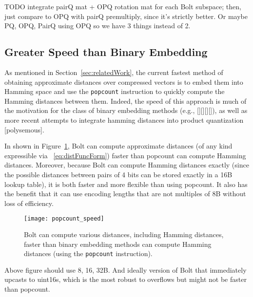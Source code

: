 TODO integrate pairQ mat + OPQ rotation mat for each Bolt subspace; then, just compare to OPQ with pairQ premultiply, since it's strictly better. Or maybe PQ, OPQ, PairQ using OPQ so we have 3 things instead of 2.


\subsection{Greater Speed than Binary Embedding}

As mentioned in Section~\ref{sec:relatedWork}, the current fastest method of obtaining approximate distances over compressed vectors is to embed them into Hamming space and use the \texttt{popcount} instruction to quickly compute the Hamming distances between them. Indeed, the speed of this approach is much of the motivation for the class of binary embedding methods (e.g., [][][][]), as well as more recent attempts to integrate hamming distances into product quantization [polysemous].

In shown in Figure~\ref{fig:bolt_vs_popcount}, Bolt can compute approximate distances (of any kind expressible via ~\ref{eq:distFuncForm}) faster than popcount can compute Hamming distances. Moreover, because Bolt can compute Hamming distances exactly (since the possible distances between pairs of 4 bits can be stored exactly in a 16B lookup table), it is both faster and more flexible than using popcount. It also has the benefit that it can use encoding lengths that are not multiples of 8B without loss of efficiency.

\begin{figure}[h]
\begin{center}
\label{fig:bolt_vs_popcount}
\texttt{[image: popcount\_speed]}
\vspace*{-1mm}
\caption{Bolt can compute various distances, including Hamming distances, faster than binary embedding methods can compute Hamming distances (using the \texttt{popcount} instruction).}
\end{center}
\end{figure}

Above figure should use 8, 16, 32B. And ideally version of Bolt that immediately upcasts to uint16s, which is the most robust to overflows but might not be faster than popcount.

